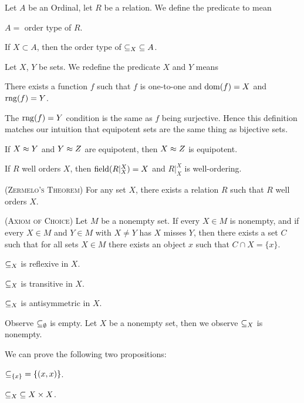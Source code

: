 \documentclass{article}
\begin{document}
\begin{definition}
Let $A$ be an Ordinal, let $R$ be a relation.
We define the predicate  to mean
\begin{defn}
\item $A = $ order type of $R$.
\end{defn}
\end{definition}

\begin{thm}
\item\label{wellord2:14} If $X\subset A$, then the order type of
  $\mathord{\subseteq_{X}}\subseteq A$.
\end{thm}

\begin{definition}
Let $X$, $Y$ be sets.
We redefine the predicate $X$ and $Y$ 
means
\begin{defn}
\item There exists a function $f$ such that $f$ is one-to-one and
  $\operatorname{dom}(f)=X$ and $\operatorname{rng}(f)=Y$.
\end{defn}
\end{definition}

\begin{remark}
The $\operatorname{rng}(f)=Y$ condition is the same as $f$ being surjective. Hence
this definition matches our intuition that equipotent sets are the same
thing as bijective sets.
\end{remark}

\begin{thm}
\item\label{wellord2:15} If $X\approx Y$ and $Y\approx Z$ are
  equipotent,
  then $X\approx Z$ is equipotent.
\item\label{wellord2:16} If $R$ well orders $X$,
  then $\operatorname{field}(R|^{X}_{X})=X$ and $R|^{X}_{X}$ is well-ordering.
\item\label{wellord2:17} (\textsc{Zermelo's Theorem})
  For any set $X$, there exists a relation $R$ such that $R$ well orders $X$.
\item\label{wellord2:18} (\textsc{Axiom of Choice})
  Let $M$ be a nonempty set.
  If every $X\in M$ is nonempty,
  and if every $X\in M$ and $Y\in M$ with $X\neq Y$ has $X$ misses $Y$,
  then there exists a set $C$ such that for all sets $X\in M$ there
  exists an object $x$ such that $C\cap X=\{x\}$.
\item\label{wellord2:19} $\mathord{\subseteq_{X}}$ is reflexive in $X$.
\item\label{wellord2:20} $\mathord{\subseteq_{X}}$ is transitive in $X$.
\item\label{wellord2:21} $\mathord{\subseteq_{X}}$ is antisymmetric in $X$.
\end{thm}
Observe $\mathord{\subseteq_{\emptyset}}$ is empty.
Let $X$ be a nonempty set, then we observe $\mathord{\subseteq_{X}}$ is nonempty.

We can prove the following two propositions:
\begin{thm}
\item\label{wellord2:22} $\mathord{\subseteq_{\{x\}}}=\{(x,x)\}$.
\item\label{wellord2:23} $\mathord{\subseteq_{X}}\subseteq X\times X$.
\end{thm}
\end{document}
